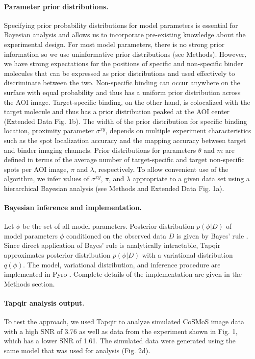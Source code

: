 \paragraph{Parameter prior distributions.}
Specifying prior probability distributions for model parameters is essential for Bayesian analysis and allows us to incorporate pre-existing knowledge about the experimental design. For most model parameters, there is no strong prior information so we use uninformative prior distributions (see Methods). However, we have strong expectations for the positions of specific and non-specific binder molecules that can be expressed as prior distributions and used effectively to discriminate between the two. Non-specific binding can occur anywhere on the surface with equal probability and thus has a uniform prior distribution across the AOI image. Target-specific binding, on the other hand, is colocalized with the target molecule and thus has a prior distribution peaked at the AOI center (Extended Data Fig. 1b). The width of the prior distribution for specific binding location, proximity parameter $\sigma^{xy}$, depends on multiple experiment characteristics such as the spot localization accuracy and the mapping accuracy between target and binder imaging channels. Prior distributions for parameters $\theta$ and $m$ are defined in terms of the average number of target-specific and target non-specific spots per AOI image, $\pi$ and $\lambda$, respectively. To allow convenient use of the algorithm, we infer values of $\sigma^{xy}$, $\pi$, and $\lambda$ appropriate to a given data set using a hierarchical Bayesian analysis (see Methods and Extended Data Fig. 1a).

\paragraph{Bayesian inference and implementation.}
Let $\phi$ be the set of all model parameters. Posterior distribution $p(\phi | D)$ of model parameters $\phi$ conditioned on the observed data $D$ is given by Bayes' rule \cite{Bishop2006-oa}. Since direct application of Bayes' rule is analytically intractable, Tapqir approximates posterior distribution $p(\phi | D)$ with a variational distribution $q(\phi)$. The model, variational distribution, and inference procedure are implemented in Pyro \cite{Bingham2019-qy}.  Complete details of the implementation are given in the Methods section.

\paragraph{Tapqir analysis output.} %
To test the approach, we used Tapqir to analyze simulated CoSMoS image data with a high SNR of 3.76 as well as data from the experiment shown in Fig. 1, which has a lower SNR of 1.61. The simulated data were generated using the same model that was used for analysis (Fig. 2d).  

